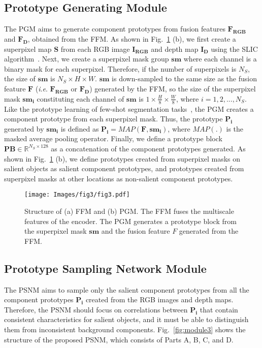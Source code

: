 \documentclass[runningheads]{llncs}
\begin{document}
	\subsection{Prototype Generating Module}
	The PGM aims to generate component prototypes from fusion features $\mathbf{F_{RGB}}$ and $\mathbf{F_D}$, obtained from the FFM. As shown in Fig.~\ref{fig:module1&2} (b), we first create a superpixel map $\mathbf{S}$ from each RGB image $\mathbf{I_{RGB}}$ and depth map $\mathbf{I_D}$ using the SLIC algorithm~\cite{achanta2012slic}. Next, we create a superpixel mask group $\mathbf{sm}$ where each channel is a binary mask for each superpixel. Therefore, if the number of superpixels is $N_S$, the size of $\mathbf{sm}$ is $N_S \times H \times W$. $\mathbf{sm}$ is down-sampled to the same size as the fusion feature $\mathbf{F}$ (\textit{i}.\textit{e}. $\mathbf{F_{RGB}}$ or $\mathbf{F_D}$) generated by the FFM, so the size of the superpixel mask $\mathbf{sm_i}$ constituting each channel of $\mathbf{sm}$ is $1 \times \frac{ H } { 8 } \times \frac{ W } { 8 }$, where $i = 1, 2, ..., N_S$. Like the prototype learning of few-shot segmentation tasks~\cite{wang2019panet,li2021adaptive,liu2020part}, the PGM creates a component prototype from each superpixel mask. Thus, the prototype $\mathbf{P _ { i }}$ generated by $\mathbf{sm_i}$ is defined as $\mathbf{P _ { i }} =MAP \left ( \mathbf{F}, \mathbf{sm_i} \right )$, where $MAP\left( . \right)$ is the masked average pooling operator. Finally, we define a prototype block $\mathbf{PB} \in \mathbb{R} ^ {N_S \times 128}$ as a concatenation of the component prototypes generated. As shown in Fig.~\ref{fig:module1&2} (b), we define prototypes created from superpixel masks on salient objects as salient component prototypes, and prototypes created from superpixel masks at other locations as non-salient component prototypes.
	
	\begin{figure}[t]
		\setlength{\belowcaptionskip}{-24pt}
		\begin{center}
			\texttt{[image: Images/fig3/fig3.pdf]}
			\caption{Structure of (a) FFM and (b) PGM. The FFM fuses the multiscale features of the encoder. The PGM generates a prototype block from the superpixel mask $\mathbf{sm}$ and the fusion feature $F$ generated from the FFM.}
			\label{fig:module1&2}
		\end{center}
	\end{figure}
	
	\subsection{Prototype Sampling Network Module}
	\label{PSNM}
	The PSNM aims to sample only the salient component prototypes from all the component prototypes $\mathbf{P _ { i }}$ created from the RGB images and depth maps. Therefore, the PSNM should focus on correlations between $\mathbf{P _ { i }}$ that contain consistent characteristics for salient objects, and it must be able to distinguish them from inconsistent background components. Fig.~\ref{fig:module3} shows the structure of the proposed PSNM, which consists of Parts A, B, C, and D.
	
\end{document}

